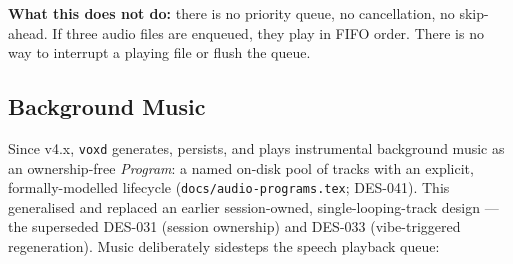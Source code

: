 \documentclass[a4paper,10pt]{article}
\begin{document}
\textbf{What this does not do:} there is no priority queue, no
cancellation, no skip-ahead.  If three audio files are enqueued,
they play in FIFO order.  There is no way to interrupt a playing
file or flush the queue.

\subsection{Background Music}
\label{sec:music}

Since v4.x, \texttt{voxd} generates, persists, and plays instrumental
background music as an ownership-free \emph{Program}: a named on-disk
pool of tracks with an explicit, formally-modelled lifecycle
(\texttt{docs/audio-programs.tex}; DES-041).  This generalised and
replaced an earlier session-owned, single-looping-track design --- the
superseded DES-031 (session ownership) and DES-033 (vibe-triggered
regeneration).  Music deliberately sidesteps the speech playback queue:
\end{document}
